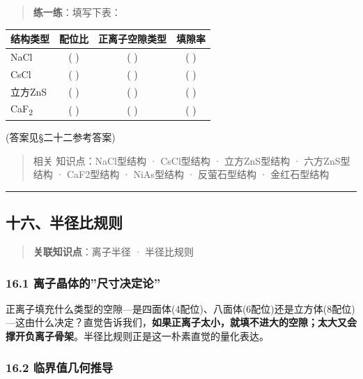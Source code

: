 \documentclass[a4paper,11pt]{ctexart}
\newcounter{none}
\newcommand{\箭}{\ensuremath{\rightarrow}}
\newcommand{\左箭}{\ensuremath{\leftarrow}}
\newcommand{\上箭}{\ensuremath{\uparrow}}
\newcommand{\下箭}{\ensuremath{\downarrow}}
\newcommand{\衡}{\ensuremath{\rightleftharpoons}}
\newcommand{\双箭}{\ensuremath{\leftrightarrow}}
\newcommand{\约等于}{\ensuremath{\approx}}
\newcommand{\小于等于}{\ensuremath{\leq}}
\newcommand{\大于等于}{\ensuremath{\geq}}
\newcommand{\不等于}{\ensuremath{\neq}}
\newcommand{\西格马}{\ensuremath{\sigma}}
\newcommand{\派}{\ensuremath{\pi}}
\begin{document}
\begin{quote}
\textbf{练一练}：填写下表：
\end{quote}

{\def\LTcaptype{none} %
\begin{longtable}[]{@{}lccc@{}}
\toprule\noalign{}
结构类型 & 配位比 & 正离子空隙类型 & 填隙率 \\
\midrule\noalign{}
\endhead
\bottomrule\noalign{}
\endlastfoot
NaCl & ( ) & ( ) & ( ) \\
CsCl & ( ) & ( ) & ( ) \\
立方ZnS & ( ) & ( ) & ( ) \\
CaF\textsubscript{2} & ( ) & ( ) & ( ) \\
\end{longtable}
}

(答案见§二十二参考答案)

\begin{quote}
相关 知识点：NaCl型结构 · CsCl型结构 · 立方ZnS型结构 · 六方ZnS型结构 · CaF2型结构 · NiAs型结构 · 反萤石型结构 · 金红石型结构
\end{quote}

\begin{center}\rule{0.5\linewidth}{0.5pt}\end{center}

\subsection{十六、半径比规则}\label{ux5341ux516dux534aux5f84ux6bd4ux89c4ux5219}

\begin{quote}
\textbf{关联知识点}：离子半径 · 半径比规则
\end{quote}

\subsubsection{16.1 离子晶体的''尺寸决定论''}\label{ux79bbux5b50ux6676ux4f53ux7684ux5c3aux5bf8ux51b3ux5b9aux8bba}

正离子填充什么类型的空隙---是四面体(4配位)、八面体(6配位)还是立方体(8配位)---这由什么决定？直觉告诉我们，\textbf{如果正离子太小，就填不进大的空隙；太大又会撑开负离子骨架}。半径比规则正是这一朴素直觉的量化表达。

\subsubsection{16.2 临界值几何推导}\label{ux4e34ux754cux503cux51e0ux4f55ux63a8ux5bfc}
\end{document}
